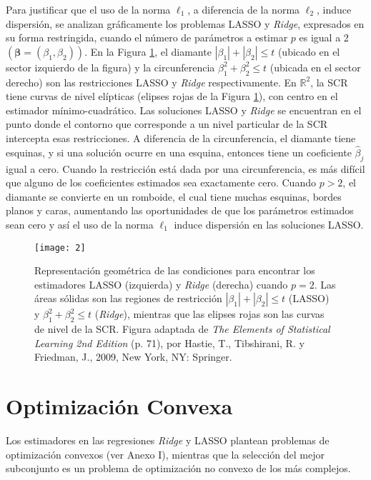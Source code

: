 \documentclass[a4paper,12pt]{report}
\begin{document}
Para justificar que el uso de la norma $\ell_1$, a diferencia de la norma $\ell_2$, induce dispersión, se analizan gráficamente los problemas LASSO y \textit{Ridge}, expresados en su forma restringida, cuando el número de parámetros a estimar $p$ es igual a 2 $\left(\boldsymbol{\beta}=(\beta_1,\beta_2)\right)$. En la Figura \ref{fig: est_lasso_ridge_noorto}, el diamante ${|\beta_1|+|\beta_2| \leq t}$ (ubicado en el sector izquierdo de la figura) y la circunferencia $\beta_1^2+\beta_2^2 \leq t$ (ubicada en el sector derecho) son las restricciones LASSO y \textit{Ridge} respectivamente. En $\mathbb{R}^2$, la SCR tiene curvas de nivel elípticas (elipses rojas de la Figura \ref{fig: est_lasso_ridge_noorto}), con centro en el estimador mínimo-cuadrático. Las soluciones LASSO y \textit{Ridge} se encuentran en el punto donde el contorno que corresponde a un nivel particular de la SCR intercepta esas restricciones. A diferencia de la circunferencia, el diamante tiene esquinas, y si una solución ocurre en una esquina, entonces tiene un coeficiente $\hat{\beta}_j$ igual a cero. Cuando la restricción está dada por una circunferencia, es más difícil que alguno de los coeficientes estimados sea exactamente cero. Cuando $p>2$, el diamante se convierte en un romboide, el cual tiene muchas esquinas, bordes planos y caras, aumentando las oportunidades de que los parámetros estimados sean cero y así el uso de la norma $\ell_1$ induce dispersión en las soluciones LASSO.

\begin{figure}[H]
	\centering
	\texttt{[image: 2]}
	\captionsetup{justification=justified}
	\caption{Representación geométrica de las condiciones para encontrar los estimadores LASSO (izquierda) y \textit{Ridge} (derecha) cuando $p=2$. Las áreas sólidas son las regiones de restricción ${|\beta_1|+|\beta_2| \leq t}$ (LASSO) y $\beta_1^2+\beta_2^2 \leq t$ (\textit{Ridge}), mientras que las elipses rojas son las curvas de nivel de la SCR. Figura adaptada de \textit{The Elements of Statistical Learning 2nd Edition} (p. 71), por Hastie, T., Tibshirani, R. y Friedman, J., 2009, New York, NY: Springer.}
	\label{fig: est_lasso_ridge_noorto}
\end{figure}

\section{Optimización Convexa}
Los estimadores en las regresiones \textit{Ridge} y LASSO plantean problemas de optimización convexos (ver Anexo I), mientras que la selección del mejor subconjunto es un problema de optimización no convexo de los más complejos.
\end{document}
